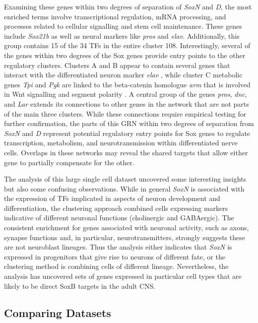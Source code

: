 \documentclass[withindex,glossary]{cam-thesis}
\begin{document}
Examining these genes within two degrees of separation of \emph{SoxN}
and \emph{D}, the most enriched terms involve transcriptional
regulation, mRNA processing, and processes related to cellular
signalling and stem cell maintenance. These genes include \emph{Sox21b}
as well as neural markers like \emph{pros} and \emph{elav}.
Additionally, this group contains 15 of the 34 TFs in the entire cluster
108. Interestingly, several of the genes within two degrees of the Sox
genes provide entry points to the other regulatory clusters. Clusters A
and B appear to contain several genes that interact with the
differentiated neuron marker \emph{elav} , while
cluster C metabolic genes \emph{Tpi} and \emph{Pgk} are linked to the
beta-catenin homologue \emph{arm} that is involved in Wnt signalling and
segment polarity . A central group of the
genes \emph{pros}, \emph{dnc}, and \emph{Lar} extends its connections to
other genes in the network that are not parts of the main three
clusters. While these connections require empirical testing for further
confirmation, the parts of this GRN within two degrees of separation
from \emph{SoxN} and \emph{D} represent potential regulatory entry
points for Sox genes to regulate transcription, metabolism, and
neurotransmission within differentiated nerve cells. Overlaps in these
networks may reveal the shared targets that allow either gene to
partially compensate for the other.

The analysis of this large single cell dataset uncovered some
interesting insights but also some confusing observations. While in
general \emph{SoxN} is associated with the expression of TFs implicated
in aspects of neuron development and differentiation, the clustering
approach combined cells expressing markers indicative of different
neuronal functions (cholinergic and GABAergic). The consistent
enrichment for genes associated with neuronal activity, such as axons,
synapse functions and, in particular, neurotransmitters, strongly
suggests these are not neuroblast lineages. Thus the analysis either
indicates that \emph{SoxN} is expressed in progenitors that give rise to
neurons of different fate, or the clustering method is combining cells
of different lineage. Nevertheless, the analysis has uncovered sets of
genes expressed in particular cell types that are likely to be direct
SoxB targets in the adult CNS.

\subsection{Comparing Datasets}
\end{document}
